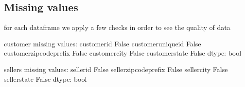 \documentclass[letterpaper,10pt,english]{jupyterBook}
\begin{document}
\subsection{Missing values}
\label{\detokenize{c7_case_studies/Olist:missing-values}}
\sphinxAtStartPar
for each dataframe we apply a few checks in order to see the quality of data

\begin{sphinxVerbatim}[commandchars=\\\{\}]
\end{sphinxVerbatim}

\begin{sphinxVerbatim}[commandchars=\\\{\}]
customer missing values: 
customer\PYGZus{}id                 False
customer\PYGZus{}unique\PYGZus{}id          False
customer\PYGZus{}zip\PYGZus{}code\PYGZus{}prefix    False
customer\PYGZus{}city               False
customer\PYGZus{}state              False
dtype: bool
\end{sphinxVerbatim}

\begin{sphinxVerbatim}[commandchars=\\\{\}]
\end{sphinxVerbatim}

\begin{sphinxVerbatim}[commandchars=\\\{\}]
sellers missing values: 
seller\PYGZus{}id                 False
seller\PYGZus{}zip\PYGZus{}code\PYGZus{}prefix    False
seller\PYGZus{}city               False
seller\PYGZus{}state              False
dtype: bool
\end{sphinxVerbatim}

\begin{sphinxVerbatim}[commandchars=\\\{\}]
\end{sphinxVerbatim}
\end{document}
